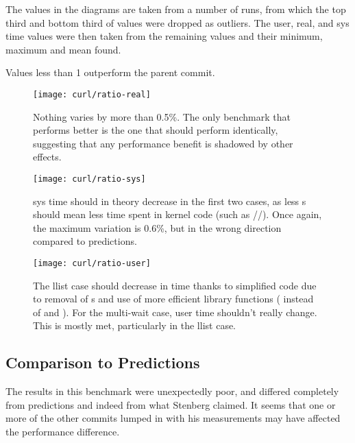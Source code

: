 The values in the diagrams are taken from a number of runs, from which the top third and bottom third of values were dropped as outliers. The user, real, and sys time values were then taken from the remaining values and their minimum, maximum and mean found.

Values less than 1 outperform the parent commit.

\begin{figure}[h]
	\centering
	\texttt{[image: curl/ratio-real]}
	\caption{Nothing varies by more than 0.5\%. The only benchmark that performs better is the one that should perform identically, suggesting that any performance benefit is shadowed by other effects.}\label{firstcurl}
\end{figure}

\begin{figure}[p]
	\centering
	\texttt{[image: curl/ratio-sys]}
	\caption{sys time should in theory decrease in the first two cases, as less \malloc{}s should mean less time spent in kernel code (such as //). Once again, the maximum variation is 0.6\%, but in the wrong direction compared to predictions.}
\end{figure}

\begin{figure}[p]
	\centering
	\texttt{[image: curl/ratio-user]}
	\caption{The llist case should decrease in time thanks to simplified code due to removal of \malloc{}s and use of more efficient library functions ( instead of \malloc{} and ). For the multi-wait case, user time shouldn't really change. This is mostly met, particularly in the llist case.}\label{lastcurl}
\end{figure}

\subsection{Comparison to Predictions}

The results in this benchmark were unexpectedly poor, and differed completely from predictions and indeed from what Stenberg claimed. It seems that one or more of the other commits lumped in with his measurements may have affected the performance difference.
